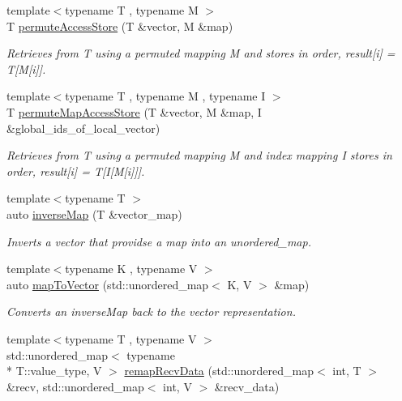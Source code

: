 \begin{DoxyCompactItemize}
{\footnotesize template$<$typename T , typename M $>$ }\\T \hyperlink{namespaceop_1_1utility_a891a70c8735b5278683c826702a2f461}{permute\-Access\-Store} (T \&vector, M \&map)
\begin{DoxyCompactList}\small\item\em Retrieves from T using a permuted mapping M and stores in order, result\mbox{[}i\mbox{]} = T\mbox{[}M\mbox{[}i\mbox{]}\mbox{]}. \end{DoxyCompactList}\item 
{\footnotesize template$<$typename T , typename M , typename I $>$ }\\T \hyperlink{namespaceop_1_1utility_aabf10d908d29b755513eff10c62b1c1b}{permute\-Map\-Access\-Store} (T \&vector, M \&map, I \&global\-\_\-ids\-\_\-of\-\_\-local\-\_\-vector)
\begin{DoxyCompactList}\small\item\em Retrieves from T using a permuted mapping M and index mapping I stores in order, result\mbox{[}i\mbox{]} = T\mbox{[}I\mbox{[}M\mbox{[}i\mbox{]}\mbox{]}\mbox{]}. \end{DoxyCompactList}\item 
{\footnotesize template$<$typename T $>$ }\\auto \hyperlink{namespaceop_1_1utility_ae569a1933fcb7983c9a86ee9ceab41cb}{inverse\-Map} (T \&vector\-\_\-map)
\begin{DoxyCompactList}\small\item\em Inverts a vector that providse a map into an unordered\-\_\-map. \end{DoxyCompactList}\item 
{\footnotesize template$<$typename K , typename V $>$ }\\auto \hyperlink{namespaceop_1_1utility_af210de28bb529e0c68da007f236c2b31}{map\-To\-Vector} (std\-::unordered\-\_\-map$<$ K, V $>$ \&map)
\begin{DoxyCompactList}\small\item\em Converts an inverse\-Map back to the vector representation. \end{DoxyCompactList}\item 
{\footnotesize template$<$typename T , typename V $>$ }\\std\-::unordered\-\_\-map$<$ typename \\*
T\-::value\-\_\-type, V $>$ \hyperlink{namespaceop_1_1utility_a5299542e400aedf6dd6d3ffa3d1b2300}{remap\-Recv\-Data} (std\-::unordered\-\_\-map$<$ int, T $>$ \&recv, std\-::unordered\-\_\-map$<$ int, V $>$ \&recv\-\_\-data)

\end{DoxyCompactItemize}
